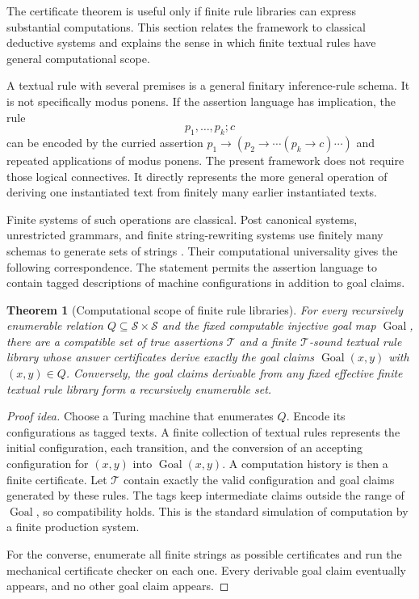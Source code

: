 \documentclass[11pt,twoside]{article}
\newtheorem{theorem}{Theorem}[section]
\theoremstyle{definition}
\newcommand{\Stext}{\mathcal S}
\newcommand{\True}{\mathcal T}
\newcommand{\Goal}{\operatorname{Goal}}
\begin{document}
The certificate theorem is useful only if finite rule libraries can express
substantial computations. This section relates the framework to classical
deductive systems and explains the sense in which finite textual rules have
general computational scope.

A textual rule with several premises is a general finitary inference-rule
schema. It is not specifically modus ponens. If the assertion language has
implication, the rule
\[
 p_1,\ldots,p_k;c
\]
can be encoded by the curried assertion
$p_1\mathbin{\to}(p_2\mathbin{\to}\cdots(p_k\mathbin{\to}c)\cdots)$ and repeated
applications of modus ponens.
The present framework does not require those logical connectives. It directly
represents the more general operation of deriving one instantiated text from
finitely many earlier instantiated texts.

Finite systems of such operations are classical. Post canonical systems,
unrestricted grammars, and finite string-rewriting systems use finitely many
schemas to generate sets of strings \cite{post,cocke-minsky}. Their computational universality gives
the following correspondence. The statement permits the assertion language
to contain tagged descriptions of machine configurations in addition to goal
claims.

\begin{theorem}[Computational scope of finite rule libraries]
\label{thm:finite-rule-universality}
For every recursively enumerable relation
$Q\subseteq\Stext\times\Stext$ and the fixed computable injective goal map
$\Goal$, there are a compatible set of true assertions $\True$ and a finite $\True$-sound textual rule
library whose answer certificates derive exactly the goal claims
$\Goal(x,y)$ with $(x,y)\in Q$. Conversely, the goal claims derivable from
any fixed effective finite textual rule library form a recursively enumerable
set.
\end{theorem}
\begin{proof}[Proof idea]
Choose a Turing machine that enumerates $Q$. Encode its configurations as
tagged texts. A finite collection of textual rules represents the initial
configuration, each transition, and the conversion of an accepting
configuration for $(x,y)$ into $\Goal(x,y)$. A computation history is then a
finite certificate. Let $\True$ contain exactly the valid configuration and
goal claims generated by these rules. The tags keep intermediate claims
outside the range of $\Goal$, so compatibility holds. This is the standard
simulation of computation by a finite production system.

For the converse, enumerate all finite strings as possible certificates and
run the mechanical certificate checker on each one. Every derivable goal
claim eventually appears, and no other goal claim appears.
\end{proof}
\end{document}
